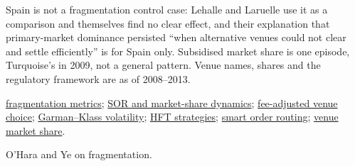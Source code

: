 \begin{qfevidence}
 Spain is not a fragmentation control case: Lehalle and Laruelle use it as a comparison and themselves find no clear effect, and their explanation that primary-market dominance persisted ``when alternative venues could not clear and settle efficiently'' is for Spain only. Subsidised market share is one episode, Turquoise's in 2009, not a general pattern. Venue names, shares and the regulatory framework are as of 2008--2013.

 \hyperref[meth:fragmentation-concentration-metrics]{fragmentation metrics}; \hyperref[mod:sor-market-share-dynamics]{SOR and market-share dynamics}; \hyperref[res:fee-adjusted-venue-choice]{fee-adjusted venue choice}; \hyperref[meth:garman-klass-volatility]{Garman--Klass volatility}; \hyperref[def:hft-strategies]{HFT strategies}; \hyperref[def:smart-order-routing]{smart order routing}; \hyperref[meth:venue-market-share]{venue market share}.

 O'Hara and Ye on fragmentation.

\end{qfevidence}
